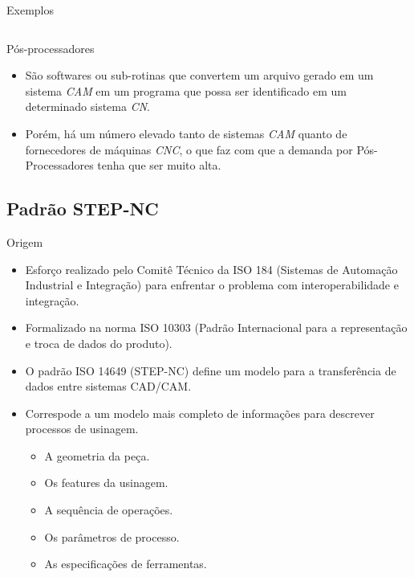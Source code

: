\documentclass[aspectratio=169]{beamer}
\begin{document}
{\begin{frame}{Exemplos}
\begin{itemize}
{\begin{table}[H]
{\begin{tabular}{p{4.3cm}|p{2.6cm}|p{2.4cm}}
          \hline

        \end{tabular}}
      \end{table}
    }    
  \end{itemize}
\end{frame}


\begin{frame}{Pós-processadores}

  \begin{itemize}

    \item {
      São softwares ou sub-rotinas 
      que convertem um arquivo gerado em um sistema \emph{CAM} 
      em um programa que possa ser identificado em um 
      determinado sistema \emph{CN}.
    }
    
    \item {
      Porém, há um número elevado tanto de sistemas
      \emph{CAM} quanto de fornecedores de máquinas \emph{CNC}, 
      o que faz com que a demanda por Pós-Processadores
      tenha que ser muito alta.
    }

  \end{itemize}   

\end{frame}


\subsection{Padrão STEP-NC}

\begin{frame}{Origem}
  \begin{itemize}
  \item {
    Esforço realizado pelo Comitê Técnico da ISO 184 (Sistemas de Automação Industrial e
    Integração) para enfrentar o problema com interoperabilidade e integração.
  }
  \item {
    Formalizado na norma ISO 10303 (Padrão Internacional para a representação e troca de dados do produto).
  }  
  \item {
    O padrão ISO 14649 (STEP-NC) define um modelo para a transferência de dados entre sistemas CAD/CAM.
  }
  \item {
    Correspode a um modelo mais completo de informações para descrever processos de usinagem.
    \begin{itemize}
      \item A geometria da peça.
      \item Os features da usinagem.
      \item A sequência de operações.
      \item Os parâmetros de processo.
      \item As especificações de ferramentas.
    \end{itemize}
  }
  \end{itemize}
\end{frame}


}
\end{document}
